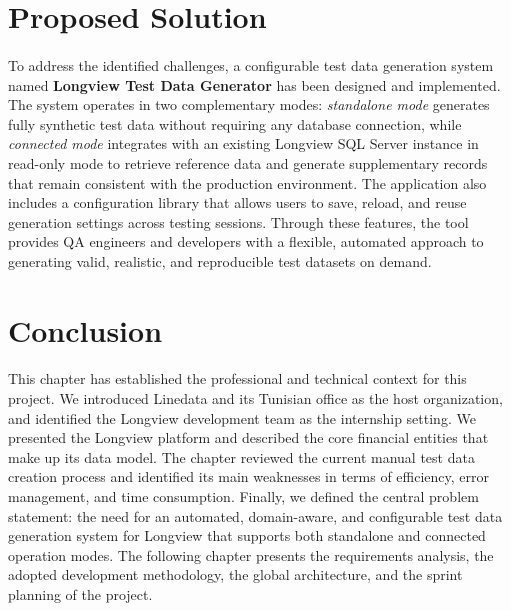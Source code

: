 \section{Proposed Solution}

\paragraph{}To address the identified challenges, a configurable test data generation system named \textbf{Longview Test Data Generator} has been designed and implemented. The system operates in two complementary modes: \textit{standalone mode} generates fully synthetic test data without requiring any database connection, while \textit{connected mode} integrates with an existing Longview SQL Server instance in read-only mode to retrieve reference data and generate supplementary records that remain consistent with the production environment. The application also includes a configuration library that allows users to save, reload, and reuse generation settings across testing sessions. Through these features, the tool provides QA engineers and developers with a flexible, automated approach to generating valid, realistic, and reproducible test datasets on demand.

\section*{Conclusion}

\paragraph{}This chapter has established the professional and technical context for this project. We introduced Linedata and its Tunisian office as the host organization, and identified the Longview development team as the internship setting. We presented the Longview platform and described the core financial entities that make up its data model. The chapter reviewed the current manual test data creation process and identified its main weaknesses in terms of efficiency, error management, and time consumption. Finally, we defined the central problem statement: the need for an automated, domain-aware, and configurable test data generation system for Longview that supports both standalone and connected operation modes. The following chapter presents the requirements analysis, the adopted development methodology, the global architecture, and the sprint planning of the project.
